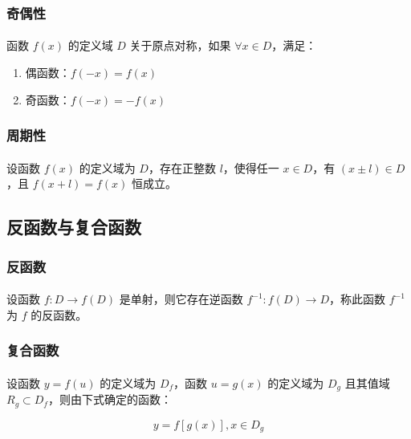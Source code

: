 \subsubsection{奇偶性}
\paragraph{}
函数 $f(x)$ 的定义域 $D$ 关于原点对称，如果 $\forall x \in D$，满足：

\begin{enumerate}
  \item 偶函数：$f(-x) = f(x)$
  \item 奇函数：$f(-x) = -f(x)$
\end{enumerate}

\subsubsection{周期性}
\paragraph{}
设函数 $f(x)$ 的定义域为 $D$，存在正整数 $l$，使得任一 $x \in D$，有 $(x \pm l) \in D$，且
 $f(x + l) = f(x)$ 恒成立。

\subsection{反函数与复合函数}

\subsubsection{反函数}
\paragraph{}
设函数 $f:D \rightarrow f(D)$ 是单射，则它存在逆函数 $f^{-1}:f(D) \rightarrow D$，称此函数 $f^{-1}$ 为 $f$ 的反函数。

\subsubsection{复合函数}
\paragraph{}
设函数 $y = f(u)$ 的定义域为 $D_f$，函数 $u = g(x)$ 的定义域为 $D_g$ 且其值域 $R_g \subset D_f$，则由下式确定的函数：

\begin{equation}
y = f[g(x)], x \in D_g
\end{equation}

